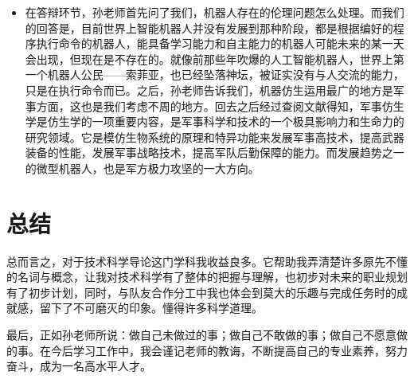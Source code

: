 \documentclass{article}
\begin{document}
\begin{itemize}
	\item 在答辩环节，孙老师首先问了我们，机器人存在的伦理问题怎么处理。而我们的回答是，目前世界上智能机器人并没有发展到那种阶段，都是根据编好的程序执行命令的机器人，能具备学习能力和自主能力的机器人可能未来的某一天会出现，但现在是不存在的。就像前那些年吹爆的人工智能机器人，世界上第一个机器人公民——索菲亚，也已经坠落神坛，被证实没有与人交流的能力，只是在执行命令而已。之后，孙老师告诉我们，机器仿生运用最广的地方是军事方面，这也是我们考虑不周的地方。回去之后经过查阅文献得知，军事仿生学是仿生学的一项重要内容，是军事科学和技术的一个极具影响力和生命力的研究领域。它是模仿生物系统的原理和特异功能来发展军事高技术，提高武器装备的性能，发展军事战略技术，提高军队后勤保障的能力。而发展趋势之一的微型机器人，也是军方极力攻坚的一大方向。\par
	
\end{itemize}



\section{总结}
总而言之，对于技术科学导论这门学科我收益良多。它帮助我弄清楚许多原先不懂的名词与概念，让我对技术科学有了整体的把握与理解，也初步对未来的职业规划有了初步计划，同时，与队友合作分工中我也体会到莫大的乐趣与完成任务时的成就感，留下了不可磨灭的印象。懂得许多科学道理。\par
最后，正如孙老师所说：做自己未做过的事；做自己不敢做的事；做自己不愿意做的事。在今后学习工作中，我会谨记老师的教诲，不断提高自己的专业素养，努力奋斗，成为一名高水平人才。

\hspace*{\fill} \\




\end{document}
